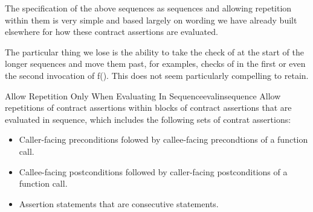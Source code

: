 The specification of the above sequences as sequences
and allowing repetition within them is very simple and based
largely on wording we have already built elsewhere for how
these contract assertions are evaluated.

The particular thing we lose is the ability to take
the check of  at the start of the longer
sequences and move them past, for examples, checks of
 in the first or even the second invocation of f().
This does not seem particularly compelling to retain.

\begin{proposal}{Allow Repetition Only When Evaluating In Sequence}{evalinsequence}
Allow repetitions of contract assertions within
blocks of contract assertions that are evaluated in sequence,
which includes the following sets of contrat assertions:
\begin{itemize}
\item{Caller-facing preconditions folowed by callee-facing precondtions
of a function call.}
\item{Callee-facing postconditions followed by caller-facing postconditions
of a function call.}
\item{Assertion statements that are consecutive statements.}
\end{itemize}
\end{proposal}




\renewcommand{\addcontentsline}[3]{}%







